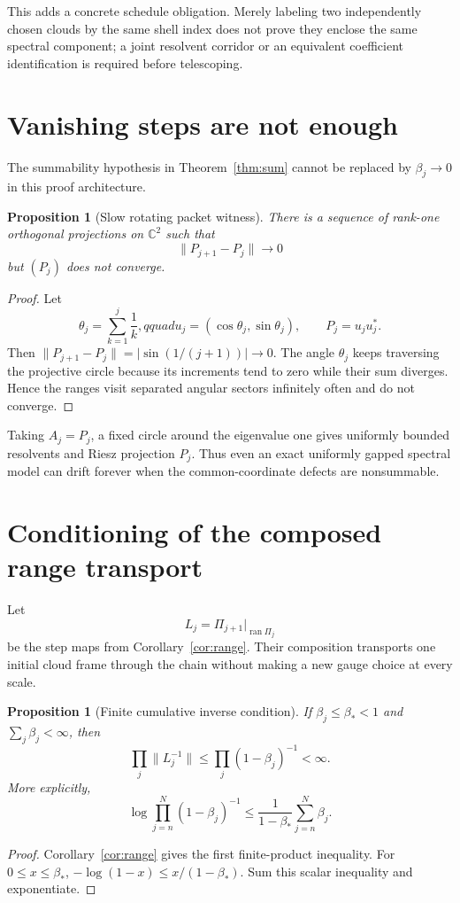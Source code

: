 \documentclass[12pt]{article}
\newtheorem{proposition}[theorem]{Proposition}
\newcommand{\norm}[1]{\lVert#1\rVert}
\begin{document}
This adds a concrete schedule obligation.  Merely labeling two independently
chosen clouds by the same shell index does not prove they enclose the same
spectral component; a joint resolvent corridor or an equivalent coefficient
identification is required before telescoping.

\section{Vanishing steps are not enough}
The summability hypothesis in Theorem~\ref{thm:sum} cannot be replaced by
$\beta_j\to0$ in this proof architecture.

\begin{proposition}[Slow rotating packet witness]
There is a sequence of rank-one orthogonal projections on $\mathbb C^2$ such
that
\[
 \norm{P_{j+1}-P_j}\longrightarrow0
\]
but $(P_j)$ does not converge.
\end{proposition}
\begin{proof}
Let
\[
 \theta_j=\sum_{k=1}^{j}\frac1k,qquad
 u_j=(\cos\theta_j,\sin\theta_j),\qquad P_j=u_ju_j^*.
\]
Then
$\norm{P_{j+1}-P_j}=|\sin(1/(j+1))|\to0$.  The angle $\theta_j$ keeps
traversing the projective circle because its increments tend to zero while
their sum diverges.  Hence the ranges visit separated angular sectors
infinitely often and do not converge.
\end{proof}

Taking $A_j=P_j$, a fixed circle around the eigenvalue one gives uniformly
bounded resolvents and Riesz projection $P_j$.  Thus even an exact uniformly
gapped spectral model can drift forever when the common-coordinate defects
are nonsummable.

\section{Conditioning of the composed range transport}
Let
\[
 L_j=\Pi_{j+1}|_{\operatorname{ran}\Pi_j}
\]
be the step maps from Corollary~\ref{cor:range}.  Their composition transports
one initial cloud frame through the chain without making a new gauge choice
at every scale.

\begin{proposition}[Finite cumulative inverse condition]
If $\beta_j\le\beta_*<1$ and $\sum_j\beta_j<\infty$, then
\[
 \prod_j\norm{L_j^{-1}}
 \le\prod_j(1-\beta_j)^{-1}<\infty.
\]
More explicitly,
\[
 \log\prod_{j=n}^{N}(1-\beta_j)^{-1}
 \le\frac1{1-\beta_*}\sum_{j=n}^{N}\beta_j.
\]
\end{proposition}
\begin{proof}
Corollary~\ref{cor:range} gives the first finite-product inequality.  For
$0\le x\le\beta_*$,
$-\log(1-x)\le x/(1-\beta_*)$.  Sum this scalar inequality and exponentiate.
\end{proof}
\end{document}
